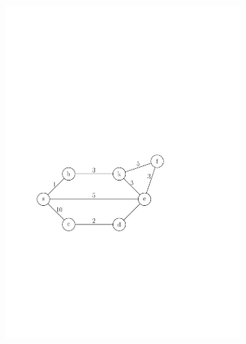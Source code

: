 \documentclass[10pt,xcolor=dvipsnames]{beamer}
\begin{document}
\begin{frame}
\begin{figure}[h]
\begin{subfigure}[b]{0.6\textwidth}
		\hspace*{22pt}\includegraphics[width=.85\linewidth]{routing_table_graph.pdf}
		\end{subfigure}
	\end{figure}
\end{frame}
\end{document}
